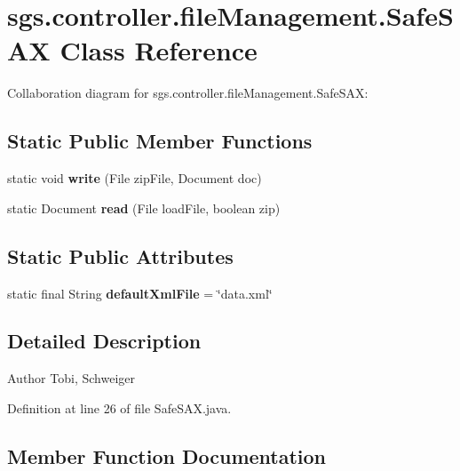 \section{sgs.\-controller.\-file\-Management.\-Safe\-S\-A\-X Class Reference}
\label{classsgs_1_1controller_1_1file_management_1_1_safe_s_a_x}


Collaboration diagram for sgs.\-controller.\-file\-Management.\-Safe\-S\-A\-X\-:
\subsection*{Static Public Member Functions}
\begin{DoxyCompactItemize}
\item 
static void {\bf write} (File zip\-File, Document doc)
\item 
static Document {\bf read} (File load\-File, boolean zip)
\end{DoxyCompactItemize}
\subsection*{Static Public Attributes}
\begin{DoxyCompactItemize}
\item 
static final String {\bf default\-Xml\-File} = \char`\"{}data.\-xml\char`\"{}
\end{DoxyCompactItemize}


\subsection{Detailed Description}
\begin{DoxyAuthor}{Author}
Tobi, Schweiger 
\end{DoxyAuthor}


Definition at line 26 of file Safe\-S\-A\-X.\-java.



\subsection{Member Function Documentation}
